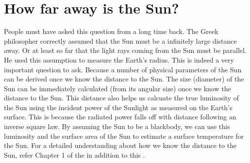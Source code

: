 \documentclass{../template/texnote}
\begin{document}


\section{How far away is the Sun?}%
People must have asked this question from a long time back.
The Greek philosopher correctly assumed that the Sun must be a infinitely large distance away. Or at least so far that the light rays coming from the Sun must be parallel.
He used this assumption to measure the Earth's radius.
This is indeed a very important question to ask. Because a number of physical parameters of the Sun can be derived once we know the distance to the Sun.
The size (diameter) of the Sun can be immediately calculated (from its angular size) once we know the distance to the Sun.
This distance also helps us calcuate the true luminosity of the Sun using the incident power of the Sunlight as measured on the Earth's surface.
This is because the radiated power falls off with distance following an inverse square law.
By assuming the Sun to be a blackbody, we can use this luminosity and the surface area of the Sun to estimate a surface temperature for the Sun.
For a detailed understanding about how we know the distance to the Sun, refer Chapter 1 of the  in addition to this .

\end{document}

